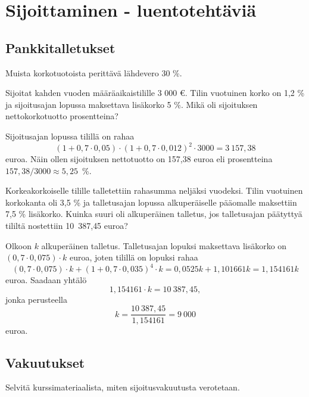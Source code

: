 \documentclass{article}\usepackage[]{graphicx}\usepackage[]{color}
\begin{document}
\section*{Sijoittaminen - luentotehtäviä}

\subsection*{Pankkitalletukset}

Muista korkotuotoista perittävä lähdevero 30 \%.

\begin{question} 
  Sijoitat kahden vuoden määräaikaistilille 3 000 \euro. Tilin vuotuinen korko on 1{,}2 \% ja sijoitusajan lopussa maksettava lisäkorko 5 \%. Mikä oli sijoituksen nettokorkotuotto prosentteina?
\end{question}
\begin{solution}

Sijoitusajan lopussa tilillä on rahaa 
\[
(1+0,7\cdot 0,05)\cdot(1+0,7\cdot 0,012)^2\cdot3000 = 3~157{,}38
\]
euroa. Näin ollen sijoituksen nettotuotto on 157{,}38 euroa eli prosentteina \(157{,}38/3000\approx 5{,}25\)~\%.
\end{solution}

\begin{question} Korkeakorkoiselle tilille talletettiin rahasumma neljäksi vuodeksi. Tilin vuotuinen korkokanta oli 3{,}5 \% ja talletusajan lopussa alkuperäiselle pääomalle maksettiin 7{,}5 \% lisäkorko. Kuinka suuri oli alkuperäinen talletus, jos talletusajan päätyttyä tililtä nostettiin 10~387{,}45 euroa?
\end{question}
\begin{solution}

  Olkoon \(k\) alkuperäinen talletus. Talletusajan lopuksi maksettava lisäkorko on \((0,7\cdot0,075)\cdot k \) euroa, joten tilillä on lopuksi rahaa
  \[
    (0,7\cdot0,075)\cdot k + (1+0,7\cdot0,035)^4\cdot k = 0{,}0525k + 1{,}101661 k = 1{,}154161 k
  \]
euroa. Saadaan yhtälö
 \[
    1{,}154161\cdot k = 10~387{,}45,
  \]
jonka perusteella
\[
  k = \frac{10~387{,}45}{1{,}154161} = 9~000
\]
euroa.
\end{solution}

\subsection*{Vakuutukset}

\begin{question} 
Selvitä kurssimateriaalista, miten sijoitusvakuutusta verotetaan. 
\end{question}
\begin{solution}
\end{solution}
\end{document}
